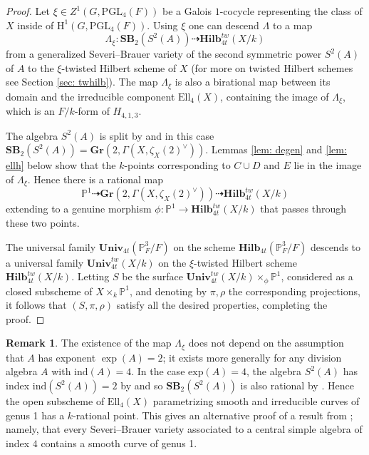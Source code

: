 \documentclass[12pt]{amsart}
\theoremstyle{definition}
\newtheorem{rmk}[thm]{Remark}
\newcommand{\HH}{\mathrm{H}}
\newcommand{\SB}{\mathbf{SB}}
\newcommand{\Hilb}{\mathbf{Hilb}}
\begin{document}
\begin{proof}
Let $\xi\in Z^1(G,\mathrm{PGL}_4(F))$ be a Galois $1$-cocycle representing the class of $X$ inside of $\HH^1(G,\mathrm{PGL}_4(F))$. Using $\xi$ one can descend $\Lambda$ to a map \[\Lambda_{\xi}: \SB_2(S^2(A))\dashrightarrow \Hilb_{4t}^{tw}(X/k)\] from a generalized Severi--Brauer variety of the second symmetric power $S^2(A)$ of $A$ to the $\xi$-twisted Hilbert scheme of $X$ (for more on twisted Hilbert schemes see Section \ref{sec: twhilb}). The map $\Lambda_\xi$ is also a birational map between its domain and the irreducible component $\mathrm{Ell}_4(X)$, containing the image of $\Lambda_\xi$, which is an $F/k$-form of $H_{4,1,3}$.

The algebra $S^2(A)$ is split by \cite[Example 4.5]{MR657430} and in this case $\SB_2(S^2(A))=\mathbf{Gr}(2,\Gamma(X,\zeta_X(2)^\vee))$. Lemmas \ref{lem: degen} and \ref{lem: ellh} below show that the $k$-points corresponding to $C\cup D$ and $E$ lie in the image of $\Lambda_\xi$. Hence there is a rational map \[\mathbb{P}^1\dashrightarrow \mathbf{Gr}(2,\Gamma(X,\zeta_X(2)^\vee))\dashrightarrow \Hilb_{4t}^{tw}(X/k)\] extending to a genuine morphism $\phi:\mathbb{P}^1\rightarrow\Hilb_{4t}^{tw}(X/k)$ that passes through these two points. 

The universal family $\mathbf{Univ}_{4t}(\mathbb{P}^3_F/F)$ on the scheme $\Hilb_{4t}(\mathbb{P}^3_F/F)$ descends to a universal family $\mathbf{Univ}_{4t}^{tw}(X/k)$ on the $\xi$-twisted Hilbert scheme $\Hilb_{4t}^{tw}(X/k)$. Letting $S$ be the surface $\mathbf{Univ}_{4t}^{tw}(X/k)\times_{\phi} \mathbb{P}^1$, considered as a closed subscheme of $X\times_k \mathbb{P}^1$, and denoting by $\pi,\rho$ the corresponding projections, it follows that $(S,\pi,\rho)$ satisfy all the desired properties, completing the proof.
\end{proof}

\begin{rmk}
The existence of the map $\Lambda_\xi$ does not depend on the assumption that $A$ has exponent $\exp(A)=2$; it exists more generally for any division algebra $A$ with $\mathrm{ind}(A)=4$. In the case $\mathrm{exp}(A)=4$, the algebra $S^2(A)$ has index $\mathrm{ind}(S^2(A))=2$ by \cite[Example 4.5]{MR657430} and so $\SB_2(S^2(A))$ is also rational by \cite[Proposition 3]{MR1092553}. Hence the open subscheme of $\mathrm{Ell}_4(X)$ parametrizing smooth and irreducible curves of genus 1 has a $k$-rational point. This gives an alternative proof of a result from \cite{MR3091612}; namely, that every Severi--Brauer variety associated to a central simple algebra of index $4$ contains a smooth curve of genus 1. 
\end{rmk}
\end{document}
